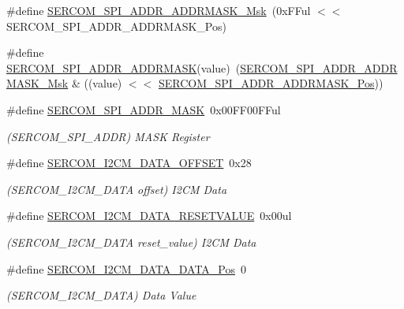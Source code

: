 \begin{DoxyCompactItemize}
\#define \mbox{\hyperlink{group___s_a_m_d21___s_e_r_c_o_m_ga10f6da95272e26b136520f78bc1fca5c}{S\+E\+R\+C\+O\+M\+\_\+\+S\+P\+I\+\_\+\+A\+D\+D\+R\+\_\+\+A\+D\+D\+R\+M\+A\+S\+K\+\_\+\+Msk}}~(0x\+F\+Ful $<$$<$ S\+E\+R\+C\+O\+M\+\_\+\+S\+P\+I\+\_\+\+A\+D\+D\+R\+\_\+\+A\+D\+D\+R\+M\+A\+S\+K\+\_\+\+Pos)
\item 
\#define \mbox{\hyperlink{group___s_a_m_d21___s_e_r_c_o_m_ga3c5cab84d43e28e76f3d453d2d9820f9}{S\+E\+R\+C\+O\+M\+\_\+\+S\+P\+I\+\_\+\+A\+D\+D\+R\+\_\+\+A\+D\+D\+R\+M\+A\+SK}}(value)~(\mbox{\hyperlink{group___s_a_m_d21___s_e_r_c_o_m_ga10f6da95272e26b136520f78bc1fca5c}{S\+E\+R\+C\+O\+M\+\_\+\+S\+P\+I\+\_\+\+A\+D\+D\+R\+\_\+\+A\+D\+D\+R\+M\+A\+S\+K\+\_\+\+Msk}} \& ((value) $<$$<$ \mbox{\hyperlink{group___s_a_m_d21___s_e_r_c_o_m_ga6d47ea34d101ac15d965c5679ab4ecae}{S\+E\+R\+C\+O\+M\+\_\+\+S\+P\+I\+\_\+\+A\+D\+D\+R\+\_\+\+A\+D\+D\+R\+M\+A\+S\+K\+\_\+\+Pos}}))
\item 
\#define \mbox{\hyperlink{group___s_a_m_d21___s_e_r_c_o_m_ga6e6df2565708defc68aa9d7336bdd5c2}{S\+E\+R\+C\+O\+M\+\_\+\+S\+P\+I\+\_\+\+A\+D\+D\+R\+\_\+\+M\+A\+SK}}~0x00\+F\+F00\+F\+Ful
\begin{DoxyCompactList}\small\item\em (S\+E\+R\+C\+O\+M\+\_\+\+S\+P\+I\+\_\+\+A\+D\+DR) M\+A\+SK Register \end{DoxyCompactList}\item 
\#define \mbox{\hyperlink{group___s_a_m_d21___s_e_r_c_o_m_gacf615e93d2fa221cbfaed4ee81d199f2}{S\+E\+R\+C\+O\+M\+\_\+\+I2\+C\+M\+\_\+\+D\+A\+T\+A\+\_\+\+O\+F\+F\+S\+ET}}~0x28
\begin{DoxyCompactList}\small\item\em (S\+E\+R\+C\+O\+M\+\_\+\+I2\+C\+M\+\_\+\+D\+A\+TA offset) I2\+CM Data \end{DoxyCompactList}\item 
\#define \mbox{\hyperlink{group___s_a_m_d21___s_e_r_c_o_m_gab8a1b1af7cbed3c0dc5c7b0c5231916d}{S\+E\+R\+C\+O\+M\+\_\+\+I2\+C\+M\+\_\+\+D\+A\+T\+A\+\_\+\+R\+E\+S\+E\+T\+V\+A\+L\+UE}}~0x00ul
\begin{DoxyCompactList}\small\item\em (S\+E\+R\+C\+O\+M\+\_\+\+I2\+C\+M\+\_\+\+D\+A\+TA reset\+\_\+value) I2\+CM Data \end{DoxyCompactList}\item 
\#define \mbox{\hyperlink{group___s_a_m_d21___s_e_r_c_o_m_ga5d492a7a17f6ef63c189c8fd0703bee4}{S\+E\+R\+C\+O\+M\+\_\+\+I2\+C\+M\+\_\+\+D\+A\+T\+A\+\_\+\+D\+A\+T\+A\+\_\+\+Pos}}~0
\begin{DoxyCompactList}\small\item\em (S\+E\+R\+C\+O\+M\+\_\+\+I2\+C\+M\+\_\+\+D\+A\+TA) Data Value \end{DoxyCompactList}\item 

\end{DoxyCompactItemize}
